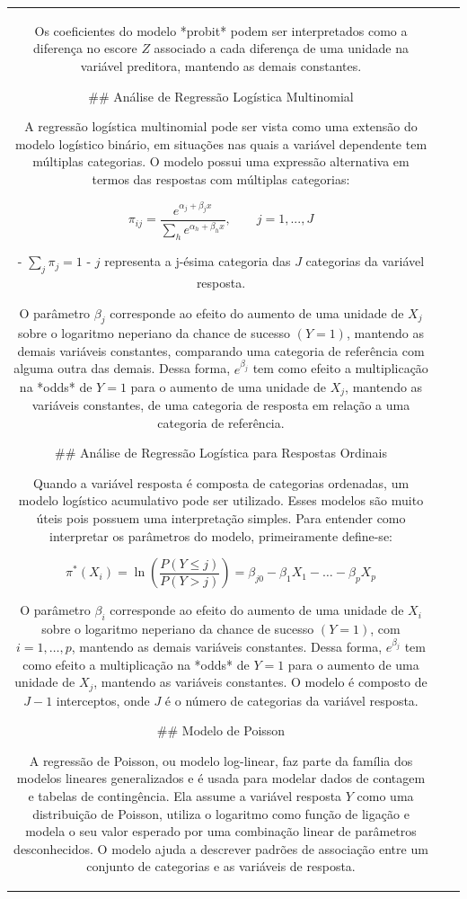 \documentclass[
]{estat/estat}
\begin{document}
\begin{tabular}{c|cc}
Os coeficientes do modelo *probit* podem ser interpretados como a diferença no escore $Z$ associado a cada diferença de uma unidade na variável preditora, mantendo as demais constantes.

## Análise de Regressão Logística Multinomial

A regressão logística multinomial pode ser vista como uma extensão do modelo logístico binário, em situações nas quais a variável dependente tem múltiplas categorias. O modelo possui uma expressão alternativa em termos das respostas com múltiplas categorias:

$$
\pi_{ij}=\frac{e^{\alpha_j+\beta_jx}}{\sum_h e^{\alpha_h+\beta_hx}}, \qquad j=1, ..., J
$$

-   $\sum_j\pi_j=1$
-   $j$ representa a j-ésima categoria das $J$ categorias da variável resposta.

O parâmetro $\beta_{j}$ corresponde ao efeito do aumento de uma unidade de $X_{j}$ sobre o logaritmo neperiano da chance de sucesso $(Y=1)$, mantendo as demais variáveis constantes, comparando uma categoria de referência com alguma outra das demais. Dessa forma, $\displaystyle e^{\beta_j}$ tem como efeito a multiplicação na *odds* de $Y=1$ para o aumento de uma unidade de $X_{j}$, mantendo as variáveis constantes, de uma categoria de resposta em relação a uma categoria de referência.

## Análise de Regressão Logística para Respostas Ordinais

Quando a variável resposta é composta de categorias ordenadas, um modelo logístico acumulativo pode ser utilizado. Esses modelos são muito úteis pois possuem uma interpretação simples. Para entender como interpretar os parâmetros do modelo, primeiramente define-se:

$$
\pi^*(X_i) = \ln\left(\frac{P(Y \le j)}{P(Y > j)}\right) = \beta_{j0} - \beta_1 X_1 - \ldots - \beta_p X_p
$$

O parâmetro $\beta_{i}$ corresponde ao efeito do aumento de uma unidade de $X_{i}$ sobre o logaritmo neperiano da chance de sucesso $(Y=1)$, com $i=1, \ldots, p$, mantendo as demais variáveis constantes. Dessa forma, $\displaystyle e^{\beta_j}$ tem como efeito a multiplicação na *odds* de $Y=1$ para o aumento de uma unidade de $X_{j}$, mantendo as variáveis constantes. O modelo é composto de $J-1$ interceptos, onde $J$ é o número de categorias da variável resposta.

## Modelo de Poisson

A regressão de Poisson, ou modelo log-linear, faz parte da família dos modelos lineares generalizados e é usada para modelar dados de contagem e tabelas de contingência. Ela assume a variável resposta $Y$ como uma distribuição de Poisson, utiliza o logaritmo como função de ligação e modela o seu valor esperado por uma combinação linear de parâmetros desconhecidos. O modelo ajuda a descrever padrões de associação entre um conjunto de categorias e as variáveis de resposta.


\end{tabular}
\end{document}
